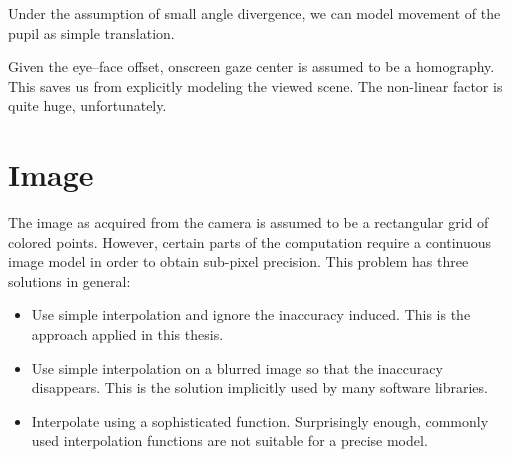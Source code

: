 Under the assumption of small angle divergence, we can model movement of the pupil as simple translation.

Given the eye--face offset, onscreen gaze center is assumed to be a homography.
This saves us from explicitly modeling the viewed scene.
The non-linear factor is quite huge, unfortunately.

\section{Image}
The image as acquired from the camera is assumed to be a rectangular grid of colored points.
However, certain parts of the computation require a continuous image model in order to obtain sub-pixel precision.
This problem has three solutions in general:

\begin{itemize}
\item Use simple interpolation and ignore the inaccuracy induced.
This is the approach applied in this thesis.

\item Use simple interpolation on a blurred image so that the inaccuracy disappears.
This is the solution implicitly used by many software libraries.

\item Interpolate using a sophisticated function.
Surprisingly enough, commonly used interpolation functions are not suitable for a precise model.

\end{itemize}

